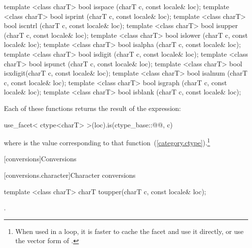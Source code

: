 %
%
%
%
%
%
%
%
%
%
%
%
\begin{itemdecl}
template <class charT> bool isspace (charT c, const locale& loc);
template <class charT> bool isprint (charT c, const locale& loc);
template <class charT> bool iscntrl (charT c, const locale& loc);
template <class charT> bool isupper (charT c, const locale& loc);
template <class charT> bool islower (charT c, const locale& loc);
template <class charT> bool isalpha (charT c, const locale& loc);
template <class charT> bool isdigit (charT c, const locale& loc);
template <class charT> bool ispunct (charT c, const locale& loc);
template <class charT> bool isxdigit(charT c, const locale& loc);
template <class charT> bool isalnum (charT c, const locale& loc);
template <class charT> bool isgraph (charT c, const locale& loc);
template <class charT> bool isblank (charT c, const locale& loc);
\end{itemdecl}

\pnum
Each of these functions
returns the result of the expression:

\begin{codeblock}
use_facet< ctype<charT> >(loc).is(ctype_base::@@, c)
\end{codeblock}

where  is the
value corresponding to that function~(\ref{category.ctype}).\footnote{When
used in a loop, it is faster to cache the
facet and use it directly, or use the vector form of
.}

[conversions]{Conversions}

[conversions.character]{Character conversions}

%
\begin{itemdecl}
template <class charT> charT toupper(charT c, const locale& loc);
\end{itemdecl}

\begin{itemdescr}
\pnum
\returns
{}.
\end{itemdescr}

